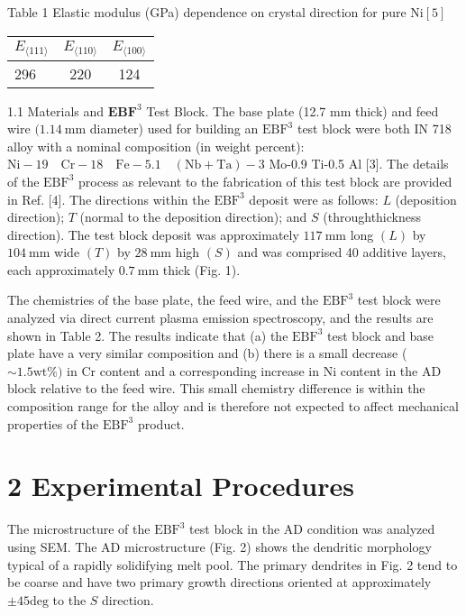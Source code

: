 \documentclass[10pt]{article}
\begin{document}
Table 1 Elastic modulus (GPa) dependence on crystal direction for pure $\mathrm{Ni}[5]$

\begin{center}
\begin{tabular}{lcc}
\hline\hline
$E_{\langle 111\rangle}$ & $E_{\langle 110\rangle}$ & $E_{\langle 100\rangle}$ \\
\hline
296 & 220 & 124 \\
\hline
\end{tabular}
\end{center}

1.1 Materials and $\mathbf{E B F}^{3}$ Test Block. The base plate (12.7 $\mathrm{mm}$ thick) and feed wire $(1.14 \mathrm{~mm}$ diameter) used for building an $\mathrm{EBF}^{3}$ test block were both IN 718 alloy with a nominal composition (in weight percent): $\mathrm{Ni}-19 \quad \mathrm{Cr}-18 \quad \mathrm{Fe}-5.1 \quad(\mathrm{Nb}+\mathrm{Ta})-3$ Mo-0.9 Ti-0.5 Al [3]. The details of the $\mathrm{EBF}^{3}$ process as relevant to the fabrication of this test block are provided in Ref. [4]. The directions within the $\mathrm{EBF}^{3}$ deposit were as follows: $L$ (deposition direction); $T$ (normal to the deposition direction); and $S$ (throughthickness direction). The test block deposit was approximately $117 \mathrm{~mm}$ long $(L)$ by $104 \mathrm{~mm}$ wide $(T)$ by $28 \mathrm{~mm}$ high $(S)$ and was comprised 40 additive layers, each approximately $0.7 \mathrm{~mm}$ thick (Fig. 1).

The chemistries of the base plate, the feed wire, and the $\mathrm{EBF}^{3}$ test block were analyzed via direct current plasma emission spectroscopy, and the results are shown in Table 2. The results indicate that (a) the $\mathrm{EBF}^{3}$ test block and base plate have a very similar composition and (b) there is a small decrease ( $\sim 1.5 \mathrm{wt} \%)$ in $\mathrm{Cr}$ content and a corresponding increase in Ni content in the AD block relative to the feed wire. This small chemistry difference is within the composition range for the alloy and is therefore not expected to affect mechanical properties of the $\mathrm{EBF}^{3}$ product.

\section*{2 Experimental Procedures}
The microstructure of the $\mathrm{EBF}^{3}$ test block in the $\mathrm{AD}$ condition was analyzed using SEM. The AD microstructure (Fig. 2) shows the dendritic morphology typical of a rapidly solidifying melt pool. The primary dendrites in Fig. 2 tend to be coarse and have two primary growth directions oriented at approximately $\pm 45 \mathrm{deg}$ to the $S$ direction.
\end{document}
